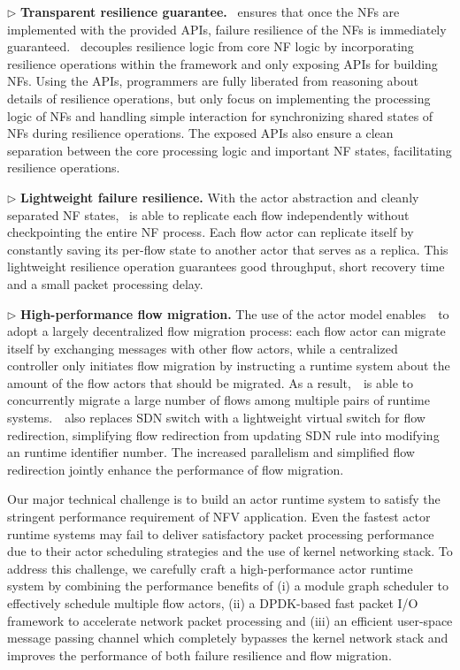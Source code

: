 $\triangleright$ \textbf{Transparent resilience guarantee.} \nfactor~ensures that once the NFs are implemented with the provided APIs, failure resilience of the NFs is immediately guaranteed. \nfactor~decouples resilience logic from core NF logic by incorporating resilience operations within the framework and only exposing APIs for building NFs. Using the APIs, programmers are fully liberated from reasoning about details of resilience operations, but only focus on implementing the processing logic of NFs and handling simple interaction for synchronizing shared states of NFs during resilience operations. The exposed APIs also ensure a clean separation between the core processing logic and important NF states, facilitating resilience operations.

$\triangleright$ \textbf{Lightweight failure resilience.} With the actor abstraction and cleanly separated NF states, \nfactor~is able to replicate each flow independently without checkpointing the entire NF process. Each flow actor can replicate itself by constantly saving its per-flow state to another actor that serves as a replica.
This lightweight resilience operation guarantees good throughput, short recovery time and a small packet processing delay.

$\triangleright$ \textbf{High-performance flow migration.} The use of the actor model enables~\nfactor~to adopt a largely decentralized flow migration process: each flow actor can migrate itself by exchanging messages with other flow actors, while a centralized controller only initiates flow migration by instructing a runtime system about the amount of the flow actors that should be migrated. As a result,~\nfactor~is able to concurrently migrate a large number of flows among multiple pairs of runtime systems.~\nfactor~also replaces SDN switch with a lightweight virtual switch for flow redirection, simplifying flow redirection from updating SDN rule into modifying an runtime identifier number. %
The increased parallelism and simplified flow redirection jointly enhance the performance of flow migration.

Our major technical challenge is to build an actor runtime system to satisfy the stringent performance requirement of NFV application. Even the fastest actor runtime systems \cite{chs-rapc-16} may fail to deliver satisfactory packet processing performance due to their actor scheduling strategies and the use of kernel networking stack. To address this challenge, we carefully craft a high-performance actor runtime system by combining the performance benefits of (i) a module graph scheduler to effectively schedule multiple flow actors, (ii) a DPDK-based \cite{dpdk} fast packet I/O framework \cite{bess} to accelerate network packet processing and (iii) an efficient user-space message passing channel which completely bypasses the kernel network stack and improves the performance of both failure resilience and flow migration.

